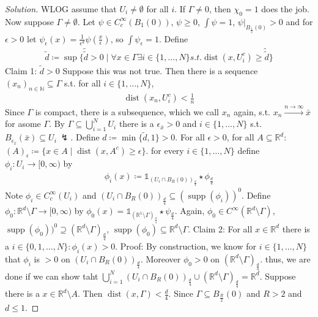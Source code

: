 \documentclass{report}
\theoremstyle{tommy}
\newcommand{\dist}{\operatorname{dist}}
\newcommand{\supp}{\operatorname{supp}}
\begin{document}
  \begin{proof}[Solution]
    WLOG assume that \(U_i \ne \emptyset\) for all \(i\). If \(\Gamma \ne 0\), then \(\chi_0 = 1\) does the job. Now suppose \(\Gamma \ne \emptyset\). Let \(\psi \in C_c^\infty(B_1(0))\), \(\psi \ge 0\), \(\int \psi = 1\), \(\psi|_{B_{\frac{1}{2}}(0)} > 0\) and for \(\epsilon > 0\) let \(\psi_\epsilon(x) = \frac{1}{\epsilon^d} \psi \left(\frac{x}{\epsilon}\right)\), so \(\int \psi_\epsilon = 1\). Define \begin{align*}
      \tilde d \coloneqq \sup \{\tilde{\tilde d} > 0 \mid \forall x \in \Gamma \exists i \in \{1, \dots, N\} s.t. \dist(x, U_i^c) \ge \tilde{\tilde d}\}
    \end{align*}
    Claim 1: \(\tilde d  > 0\) Suppose this was not true. Then there is a sequence \((x_n)_{n \in \mathbb{N}} \subseteq \Gamma\) s.t. for all \(i \in \{1, \dots, N\}\), 
    \begin{align*}
      \dist(x_n, U_i^c) < \frac{1}{n}
    \end{align*}
    Since \(\Gamma\) is compact, there is a subsequence, which we call \(x_n\) again, s.t. \(x_n \xrightarrow{n \to \infty} \bar x\) for asome \(\Gamma\). By \(\Gamma \subseteq \bigcup_{i=1}^N U_i\) there is a \(\epsilon_{\bar x} > 0\) and \(i \in \{1, \dots, N\}\) s.t. \(B_{\epsilon_{\bar x}}(\bar x) \subseteq U_i\ \lightning\).
    Define \(d \coloneqq \min\{\tilde d, 1\} > 0\). For all \(\epsilon > 0\), for all \(A \subseteq \mathbb{R}^d\): \((A)_\epsilon \coloneqq \{x \in A \mid \dist(x, A^c) \ge \epsilon\}\). for every \(i \in \{1, \dots, N\}\) define \(\phi_i: U_i \to [0,\infty)\) by
    \begin{align*}
      \phi_i(x) \coloneqq \mathbb{1}_{(U_i \cap B_R(0))_{\frac{d}{4}}} \star \phi_{\frac{d}{4}}
    \end{align*}
    Note \(\phi_i \in C_c^\infty(U_i)\) and \((U_i \cap B_R(0))_{\frac{d}{4}} \subseteq (\supp(\phi_i))^0\). Define \(\phi_0: \mathbb{R}^d \setminus \Gamma \to [0, \infty)\) by \(\phi_0(x) = \mathbb{1}_{(\mathbb{R}^1 \setminus \Gamma)_{\frac{d}{4}}} \star \psi_{\frac{d}{4}}\). Again, \(\phi_0 \in C^\infty(\mathbb{R}^d \setminus \Gamma)\), \(\supp(\phi_0))^0 \supseteq (\mathbb{R}^d \setminus \Gamma)_{\frac{d}{4}}\), \(\supp(\phi_0) \subseteq \mathbb{R}^d \setminus \Gamma\). 
    Claim 2: For all \(x \in \mathbb{R}^d\) there is a \(i \in \{0, 1, \dots, N\}: \phi_i (x) > 0\). Proof: By construction, we know for \(i \in \{1, \dots, N\}\) that \(\phi_i\) is \(>0\) on \((U_i \cap B_R(0))_{\frac{d}{4}}\). Moreover \(\phi_0 > 0\) on \((\mathbb{R}^d \setminus \Gamma)_{\frac{d}{4}}\). thus, we are done if we can show taht \(\bigcup_{i=1}^N (U_i \cap B_R(0))_{\frac{d}{4}} \cup (\mathbb{R}^d \setminus \Gamma)_{\frac{d}{4}} = \mathbb{R}^d\). Suppose there is a \(x \in \mathbb{R}^d \setminus A\). Then \(\dist(x, \Gamma) < \frac{d}{4}\). Since \(\Gamma \subseteq B_{\frac{R}{2}}(0)\) and \(R > 2\) and \(d \le 1\).

\end{proof}
\end{document}
